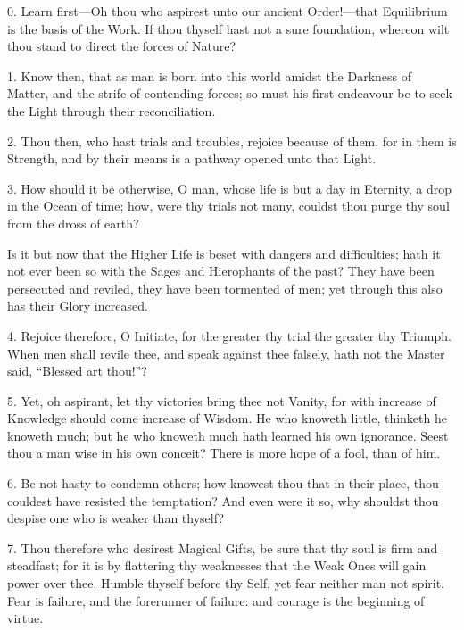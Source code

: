 
0. Learn first---Oh thou who aspirest unto our ancient Order!---that Equilibrium is the basis of the Work. If thou thyself hast not a sure foundation, whereon wilt thou stand to direct the forces of Nature?

1. Know then, that as man is born into this world amidst the Darkness of Matter, and the strife of contending forces; so must his first endeavour be to seek the Light through their reconciliation.

2. Thou then, who hast trials and troubles, rejoice because of them, for in them is Strength, and by their means is a pathway opened unto that Light.

3. How should it be otherwise, O man, whose life is but a day in Eternity, a drop in the Ocean of time; how, were thy trials not many, couldst thou purge thy soul from the dross of earth?

Is it but now that the Higher Life is beset with dangers and difficulties; hath it not ever been so with the Sages and Hierophants of the past? They have been persecuted and reviled, they have been tormented of men; yet through this also has their Glory increased.

4. Rejoice therefore, O Initiate, for the greater thy trial the greater thy Triumph. When men shall revile thee, and speak against thee falsely, hath not the Master said, \enquote{Blessed art thou!}?

5. Yet, oh aspirant, let thy victories bring thee not Vanity, for with increase of Knowledge should come increase of Wisdom. He who knoweth little, thinketh he knoweth much; but he who knoweth much hath learned his own ignorance. Seest thou a man wise in his own conceit? There is more hope of a fool, than of him.

6. Be not hasty to condemn others; how knowest thou that in their place, thou couldest have resisted the temptation? And even were it so, why shouldst thou despise one who is weaker than thyself?

7. Thou therefore who desirest Magical Gifts, be sure that thy soul is firm and steadfast; for it is by flattering thy weaknesses that the Weak Ones will gain power over thee. Humble thyself before thy Self, yet fear neither man not spirit. Fear is failure, and the forerunner of failure: and courage is the beginning of virtue.

